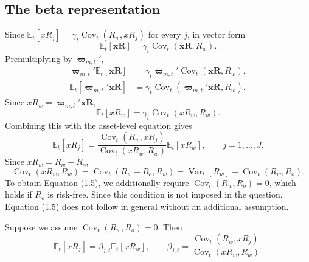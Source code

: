 \documentclass[11pt]{article}
\newcommand{\Et}{\mathbb{E}_t}
\newcommand{\Vt}{\operatorname{Var}_t}
\newcommand{\Ct}{\operatorname{Cov}_t}
\begin{document}
\subsection*{The beta representation}
Since $\Et[xR_j]=\gamma_t\Ct(R_w,xR_j)$ for every $j$, in vector form
\[
\Et[\mathbf{xR}]=\gamma_t\Ct(\mathbf{xR},R_w).
\]
Premultiplying by $\boldsymbol\varpi_{m,t}'$,
\begin{align*}
\boldsymbol\varpi_{m,t}'\Et[\mathbf{xR}]
&=\gamma_t\boldsymbol\varpi_{m,t}'\Ct(\mathbf{xR},R_w),\\
\Et[\boldsymbol\varpi_{m,t}'\mathbf{xR}]
&=\gamma_t\Ct(\boldsymbol\varpi_{m,t}'\mathbf{xR},R_w).
\end{align*}
Since $xR_w=\boldsymbol\varpi_{m,t}'\mathbf{xR}$,
\[
\Et[xR_w]=\gamma_t\Ct(xR_w,R_w).
\]
Combining this with the asset-level equation gives
\[
\Et[xR_j]=\frac{\Ct(R_w,xR_j)}{\Ct(xR_w,R_w)}\Et[xR_w],
\qquad j=1,\ldots,J.
\]
Since $xR_w=R_w-R_o$,
\[
\Ct(xR_w,R_w)=\Ct(R_w-R_o,R_w)
=\Vt[R_w]-\Ct(R_w,R_o).
\]
To obtain Equation (1.5), we additionally require $\Ct(R_w,R_o)=0$,
which holds if $R_o$ is risk-free. Since this condition is not imposed
in the question, Equation (1.5) does not follow in general without an
additional assumption.

Suppose we assume $\Ct(R_w,R_o)=0$. Then
\[
\boxed{\Et[xR_j]=\beta_{j,t}\Et[xR_w],\qquad
\beta_{j,t}=\frac{\Ct(R_w,xR_j)}{\Ct(xR_w,R_w)}.}
\]

\clearpage
\end{document}
